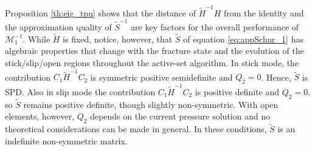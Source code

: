 \documentclass[3p,times]{elsarticle}
\theoremstyle{plain}
\newcommand{\Mat}[1]{#1}
\newcommand{\tS}{\widetilde{S}}
\newcommand{\tH}{\widetilde{H}}
\newcommand{\tT}{\widetilde{T}}
\begin{document}
\begin{rem}
Proposition \ref{th:eig_tpu} shows that the distance of $\tH^{-1}H$ from the identity and 
the approximation quality of $\tS^{-1}$ are key factors for the overall performance of $\mathcal{M}_1^{-1}$. 
While $\tH$ is fixed,
notice, however, that $\tS$ of equation \eqref{eq:appSchur_1} has algebraic properties that change with the fracture state and the evolution of the stick/slip/open regions throughout the active-set algorithm.  
In stick mode,
the contribution $\Mat{C}_1 \Mat{\tH}^{-1} \Mat{C}_2$ is symmetric positive semidefinite and $Q_2=0$. Hence, $\tS$ is SPD.  
Also in slip mode the contribution $\Mat{C}_1 \Mat{\tH}^{-1} \Mat{C}_2$ is
positive definite and $Q_2=0$, so $\tS$ remains positive definite, though slightly non-symmetric. 
With open elements, however, $\Mat{Q_2}$ depends on the current pressure solution and no theoretical considerations can be made in general. In these conditions,
$\tS$ is an indefinite non-symmetric matrix. 
\end{rem}

\end{document}
